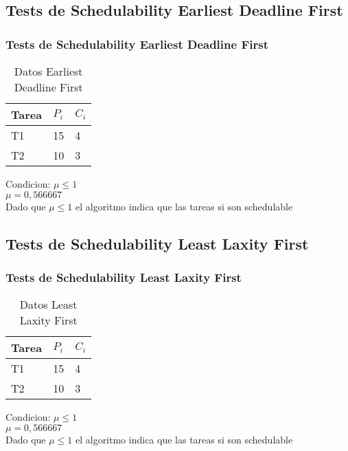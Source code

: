 \documentclass[xcolor=table]{beamer}
\begin{document}
\subsection{Tests de Schedulability  Earliest Deadline First } 

\begin{frame} 
\frametitle{Tests de Schedulability  Earliest Deadline First } 
\begin{table} 
\centering 
\begin{tabular}{|l|l|l|} 
\hline 
\cellcolor{lightgray}Tarea & \cellcolor{lightgray}$P_i$ & \cellcolor{lightgray}$C_i$ \\ \hline 
T1   & 15  &  4\\ \hline 
T2   & 10  &  3\\ \hline 
\end{tabular} 
\caption{Datos  Earliest Deadline First } 
\end{table} 
Condicion: $\mu \leq 1$ \\ 
$\mu =  0,566667 $ \\ 
Dado que $\mu \leq 1$ el algoritmo indica que las tareas si son schedulable \\ 
\end{frame} 

\subsection{Tests de Schedulability  Least Laxity First } 

\begin{frame} 
\frametitle{Tests de Schedulability  Least Laxity First } 
\begin{table} 
\centering 
\begin{tabular}{|l|l|l|} 
\hline 
\cellcolor{lightgray}Tarea & \cellcolor{lightgray}$P_i$ & \cellcolor{lightgray}$C_i$ \\ \hline 
T1   & 15  &  4\\ \hline 
T2   & 10  &  3\\ \hline 
\end{tabular} 
\caption{Datos  Least Laxity First } 
\end{table} 
Condicion: $\mu \leq 1$ \\ 
$\mu =  0,566667 $ \\ 
Dado que $\mu \leq 1$ el algoritmo indica que las tareas si son schedulable \\ 
\end{frame} 
\end{document}
